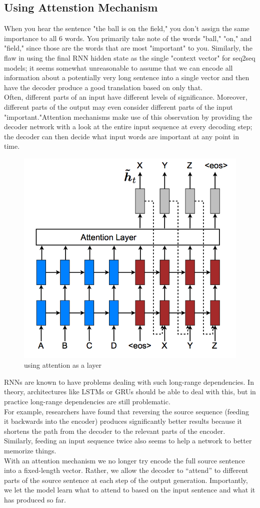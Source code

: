 \subsection{Using Attenstion Mechanism}
When you hear the sentence "the ball is on the field," you don’t assign
the same importance to all 6 words. You primarily take note of
the words "ball," "on," and "field," since those are the words that are
most "important" to you.  Similarly, the flaw
in using the final RNN hidden state as the single "context vector" for
seq2seq models; it seems somewhat unreasonable to assume that we can encode all information about a potentially very long sentence into a single vector and then have the decoder produce a good translation based on only that.\\ Often, different parts of an input have different levels of significance. Moreover, different parts of the output
may even consider different parts of the input "important."Attention mechanisms make use of this observation by providing
the decoder network with a look at the entire input sequence at every
decoding step; the decoder can then decide what input words are
important at any point in time.\\
\begin{figure}[H]%
    \center%
    \includegraphics[width=.6\textwidth]{images/amir/Feeding-Hidden-State-as-Input-to-Decoder.png}%
    \caption[This is a attention image]{using  attention as a layer
    }\label{fig:attention}%
  \end{figure}
RNNs are known to have problems dealing with such long-range dependencies. In theory, architectures like LSTMs or GRUs should be able to deal with this, but in practice long-range dependencies are still problematic.\\
For example, researchers have found that reversing the source sequence (feeding it backwards into the encoder) produces significantly better results because it shortens the path from the decoder to the relevant parts of the encoder. Similarly, feeding an input sequence twice also seems to help a network to better memorize things.\\
With an attention mechanism we no longer try encode the full source sentence into a fixed-length vector. Rather, we allow the decoder to “attend” to different parts of the source sentence at each step of the output generation. Importantly, we let the model learn what to attend to based on the input sentence and what it has produced so far.\cite{web019}
